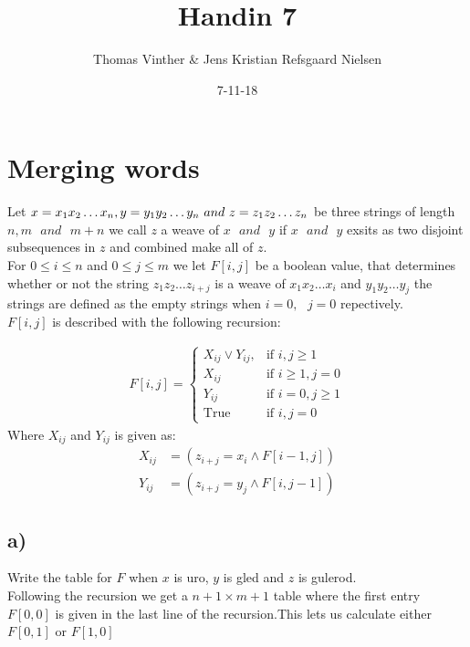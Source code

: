 \documentclass{article}
\theoremstyle{remark}
\numberwithin{equation}{section}
\begin{document}
	\author{Thomas Vinther \& Jens Kristian Refsgaard Nielsen}
	\title{Handin 7}
	\date{7-11-18}
	\maketitle
	\section{Merging words}
	Let $ x = x_1 x_2\dots x_n, \space y = y_1 y_2 \dots y_n \text{ } and \text{ } z= z_1 z_2 \dots z_n$ be three strings of length $n, m \text{ }and\text{ } m+n $ we call $z$ a weave of $x \text{ } and \text{ } y $ if $x \text{ } and \text{ } y $ exsits as two disjoint subsequences in $z$ and combined make all of $z$.\\
	
	For $ 0 \leq i \leq n$ and $0\leq j \leq m$ we let $F[i,j]$ be a boolean value, that determines whether or not the string $z_1 z_2 \dots z_{i+j}$ is a weave of $x_1 x_2 \dots x_i$ and $y_1 y_2 \dots y_j$ the strings are defined as the empty strings when $i=0, \text{ } j=0$ repectively. \\
	$F[i,j]$ is described with the following recursion: 
	
\begin{align}\label{recursion}
F[i,j] = \begin{cases}
X_{ij} \vee Y_{ij}, & \text{if } i,j\geq 1\\
X_{ij} &  \text{if } i\geq 1, j=0\\
 Y_{ij}&  \text{if } i=0,j\geq 1\\
\text{True} &  \text{if } i,j=0
\end{cases}
\end{align}	
Where $X_{ij}$ and $Y_{ij}$ is given as: 
\begin{align}
X_{ij}&=(z_{i+j}=x_i \wedge F[i-1,j])\\
Y_{ij}&=(z_{i+j}=y_j \wedge F[i,j-1])
\end{align}
	

	\subsection{a)}
	Write the table for $F$ when $x$ is uro, $y$ is gled and $z$ is gulerod.\\
	
	Following the recursion we get a $n+1 \times m+1$ table where the first entry $F[0,0]$ is given in the last line of the recursion.This lets us calculate either $F[0,1]$ or $F[1,0]$\\
	
\end{document}
